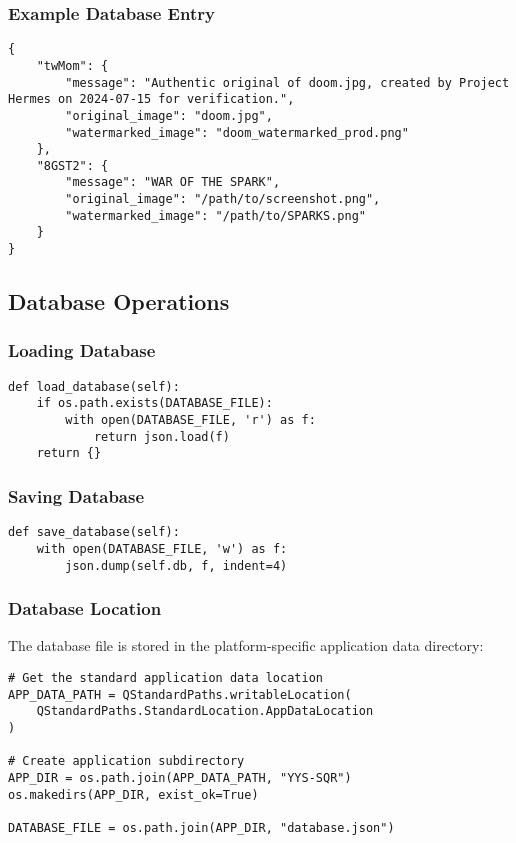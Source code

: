 \documentclass[12pt,a4paper]{article}
\begin{document}
\subsubsection{Example Database Entry}

\begin{lstlisting}[caption=Example Database Entry]
{
    "twMom": {
        "message": "Authentic original of doom.jpg, created by Project Hermes on 2024-07-15 for verification.",
        "original_image": "doom.jpg",
        "watermarked_image": "doom_watermarked_prod.png"
    },
    "8GST2": {
        "message": "WAR OF THE SPARK",
        "original_image": "/path/to/screenshot.png",
        "watermarked_image": "/path/to/SPARKS.png"
    }
}
\end{lstlisting}

\subsection{Database Operations}

\subsubsection{Loading Database}

\begin{lstlisting}[caption=Database Loading]
def load_database(self):
    if os.path.exists(DATABASE_FILE):
        with open(DATABASE_FILE, 'r') as f:
            return json.load(f)
    return {}
\end{lstlisting}

\subsubsection{Saving Database}

\begin{lstlisting}[caption=Database Saving]
def save_database(self):
    with open(DATABASE_FILE, 'w') as f:
        json.dump(self.db, f, indent=4)
\end{lstlisting}

\subsubsection{Database Location}

The database file is stored in the platform-specific application data directory:

\begin{lstlisting}[caption=Database Location Configuration]
# Get the standard application data location
APP_DATA_PATH = QStandardPaths.writableLocation(
    QStandardPaths.StandardLocation.AppDataLocation
)

# Create application subdirectory
APP_DIR = os.path.join(APP_DATA_PATH, "YYS-SQR")
os.makedirs(APP_DIR, exist_ok=True)

DATABASE_FILE = os.path.join(APP_DIR, "database.json")
\end{lstlisting}
\end{document}
